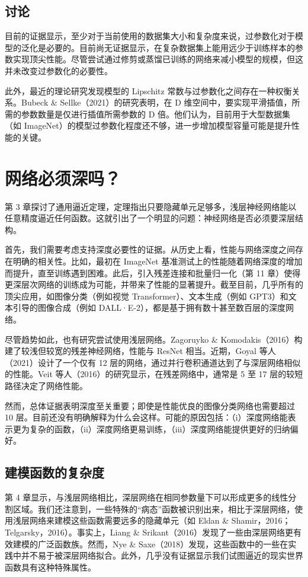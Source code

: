 \subsection{讨论}
目前的证据显示，至少对于当前使用的数据集大小和复杂度来说，过参数化对于模型的泛化是必要的。目前尚无证据显示，在复杂数据集上能用远少于训练样本的参数实现顶尖性能。尽管尝试通过修剪或蒸馏已训练的网络来减小模型的规模，但这并未改变过参数化的必要性。

此外，最近的理论研究发现模型的 Lipschitz 常数与过参数化之间存在一种权衡关系。Bubeck \& Sellke（2021）的研究表明，在 D 维空间中，要实现平滑插值，所需的参数数量是仅进行插值所需参数的 D 倍。他们认为，目前用于大型数据集（如 ImageNet）的模型过参数化程度还不够，进一步增加模型容量可能是提升性能的关键。


\section{网络必须深吗？}
第 3 章探讨了通用逼近定理，定理指出只要隐藏单元足够多，浅层神经网络能以任意精度逼近任何函数。这就引出了一个明显的问题：神经网络是否必须要深层结构。

首先，我们需要考虑支持深度必要性的证据。从历史上看，性能与网络深度之间存在明确的相关性。比如，最初在 ImageNet 基准测试上的性能随着网络深度的增加而提升，直至训练遇到困难。此后，引入残差连接和批量归一化（第 11 章）使得更深层次网络的训练成为可能，并带来了性能的显著提升。截至目前，几乎所有的顶尖应用，如图像分类（例如视觉 Transformer）、文本生成（例如 GPT3）和文本引导的图像合成（例如 DALL·E-2），都是基于拥有数十甚至数百层的深度网络。

尽管趋势如此，也有研究尝试使用浅层网络。Zagoruyko \& Komodakis（2016）构建了较浅但较宽的残差神经网络，性能与 ResNet 相当。近期，Goyal 等人（2021）设计了一个仅有 12 层的网络，通过并行卷积通道达到了与深层网络相似的性能。Veit 等人（2016）的研究显示，在残差网络中，通常是 5 至 17 层的较短路径决定了网络性能。

然而，总体证据表明深度至关重要；即使是性能优良的图像分类网络也需要超过 10 层。目前还没有明确解释为什么会这样。可能的原因包括：（i）深度网络能表示更为复杂的函数，（ii）深度网络更易训练，（iii）深度网络能提供更好的归纳偏好。


\subsection{建模函数的复杂度}
第 4 章显示，与浅层网络相比，深层网络在相同参数量下可以形成更多的线性分割区域。我们还注意到，一些特殊的“病态”函数被识别出来，相比于深层网络，使用浅层网络来建模这些函数需要远多的隐藏单元（如 Eldan \& Shamir，2016；Telgarsky，2016）。事实上，Liang \& Srikant（2016）发现了一些由深层网络更有效建模的广泛函数族。然而，Nye \& Saxe（2018）发现，这些函数中的一些在实践中并不易于被深层网络拟合。此外，几乎没有证据显示我们试图逼近的现实世界函数具有这种特殊属性。

